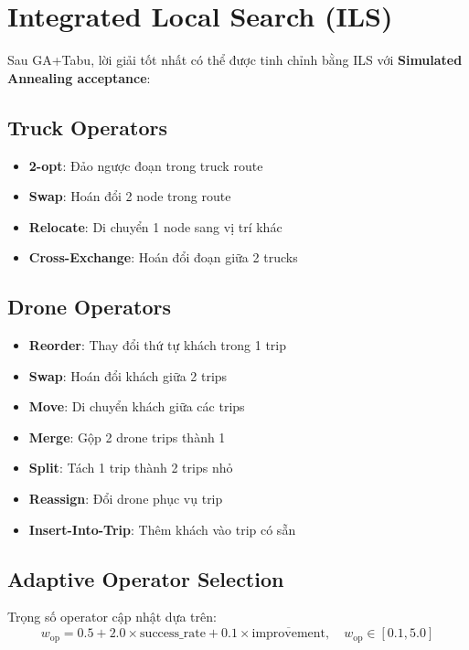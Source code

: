 \documentclass[12pt,a4paper]{article}
\begin{document}
\section{Integrated Local Search (ILS)}

Sau GA+Tabu, lời giải tốt nhất có thể được tinh chỉnh bằng ILS với \textbf{Simulated Annealing acceptance}:

\subsection{Truck Operators}
\begin{itemize}[nosep]
    \item \textbf{2-opt}: Đảo ngược đoạn trong truck route
    \item \textbf{Swap}: Hoán đổi 2 node trong route
    \item \textbf{Relocate}: Di chuyển 1 node sang vị trí khác
    \item \textbf{Cross-Exchange}: Hoán đổi đoạn giữa 2 trucks
\end{itemize}

\subsection{Drone Operators}
\begin{itemize}[nosep]
    \item \textbf{Reorder}: Thay đổi thứ tự khách trong 1 trip
    \item \textbf{Swap}: Hoán đổi khách giữa 2 trips
    \item \textbf{Move}: Di chuyển khách giữa các trips
    \item \textbf{Merge}: Gộp 2 drone trips thành 1
    \item \textbf{Split}: Tách 1 trip thành 2 trips nhỏ
    \item \textbf{Reassign}: Đổi drone phục vụ trip
    \item \textbf{Insert-Into-Trip}: Thêm khách vào trip có sẵn
\end{itemize}

\subsection{Adaptive Operator Selection}

Trọng số operator cập nhật dựa trên:
\begin{equation}
    w_{\text{op}} = 0.5 + 2.0 \times \text{success\_rate} + 0.1 \times \overline{\text{improvement}}, \quad w_{\text{op}} \in [0.1, 5.0]
\end{equation}
\end{document}
